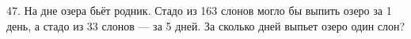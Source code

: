 47. На дне озера бьёт родник. Стадо из 163 слонов могло бы выпить озеро за 1 день, а стадо из 33 слонов --- за 5 дней. За сколько дней выпьет озеро один слон?\\
